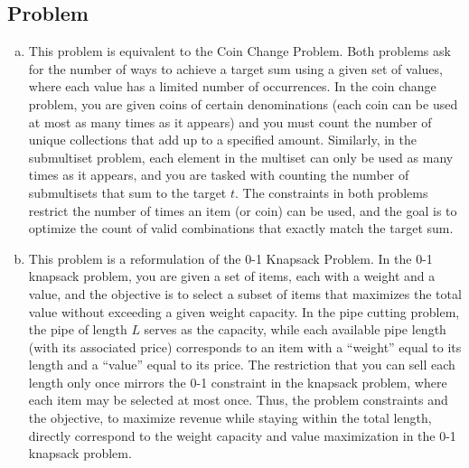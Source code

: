 \documentclass[12pt, letterpaper]{article}
\theoremstyle{definition}
\newcounter{problem}
\newcommand{\q}{
    \newpage %
    \stepcounter{problem} %
    \subsection*{Problem \arabic{problem}} %
}
\begin{document}
\q
\begin{enumerate}[(a)]
    \item This problem is equivalent to the Coin Change Problem. Both problems ask for the number of ways to achieve a target sum using a given set of values, where each value has a limited number of occurrences. In the coin change problem, you are given coins of certain denominations (each coin can be used at most as many times as it appears) and you must count the number of unique collections that add up to a specified amount. Similarly, in the submultiset problem, each element in the multiset can only be used as many times as it appears, and you are tasked with counting the number of submultisets that sum to the target $t$. The constraints in both problems restrict the number of times an item (or coin) can be used, and the goal is to optimize the count of valid combinations that exactly match the target sum.
    \item This problem is a reformulation of the 0-1 Knapsack Problem. In the 0-1 knapsack problem, you are given a set of items, each with a weight and a value, and the objective is to select a subset of items that maximizes the total value without exceeding a given weight capacity. In the pipe cutting problem, the pipe of length $L$ serves as the capacity, while each available pipe length (with its associated price) corresponds to an item with a “weight” equal to its length and a “value” equal to its price. The restriction that you can sell each length only once mirrors the 0-1 constraint in the knapsack problem, where each item may be selected at most once. Thus, the problem constraints and the objective, to maximize revenue while staying within the total length, directly correspond to the weight capacity and value maximization in the 0-1 knapsack problem.
\end{enumerate}
\end{document}
